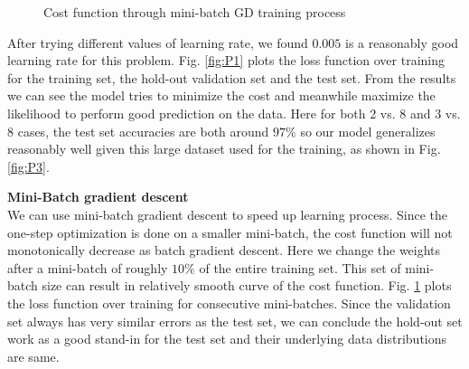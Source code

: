 \documentclass{article} %
\begin{document}
\begin{figure}%
	\centering
	\qquad
	\caption{Cost function through mini-batch GD training process}%
	\label{fig:P2}%
\end{figure}

After trying different values of learning rate, we found $0.005$ is a reasonably good learning rate for this problem. Fig. \ref{fig:P1} plots the  loss function over training for the training set, the hold-out validation set and the test set. From the results we can see the model tries to minimize the cost and meanwhile maximize the likelihood to perform good prediction on the data. Here for both 2 vs. 8 and 3 vs. 8 cases, the test set accuracies are both around $97\%$ so our model generalizes reasonably well given this large dataset used for the training, as shown in Fig. \ref{fig:P3}.

\textbf{Mini-Batch gradient descent}\\
We can use mini-batch gradient descent to speed up learning process. Since the one-step optimization is done on a smaller mini-batch, the cost function will not monotonically decrease as batch gradient descent. Here we change the weights after a mini-batch of roughly $10\%$ of the entire training set. This set of mini-batch size can result in relatively smooth curve of the cost function. Fig. \ref{fig:P2} plots the loss function over training for consecutive mini-batches. Since the validation set always has very similar errors as the test set, we can conclude the hold-out set work as a good stand-in for the test set and their underlying data distributions are same.
\end{document}
